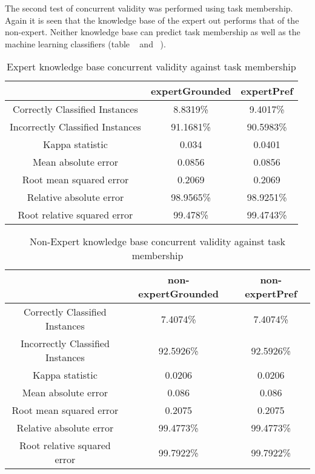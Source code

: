 The second test of concurrent validity was performed using task membership. Again it is seen that the knowledge base of the expert out performs that of the non-expert. Neither knowledge base can predict task membership as well as the machine learning classifiers (table ~\cite{tab:ecurrenttask} and ~\cite{tab:necurrenttask}). %

\begin{table}[!htbp]
\centering
\begin{tabular}{|c|c|c|}
\hline
                                 & expertGrounded  & expertPref \\ \hline
Correctly Classified Instances   & 8.8319\%      & 9.4017\% \\
Incorrectly Classified Instances & 91.1681\%     & 90.5983\% \\
Kappa statistic                  & 0.034         & 0.0401    \\
Mean absolute error              & 0.0856        & 0.0856    \\
Root mean squared error          & 0.2069        & 0.2069    \\
Relative absolute error          & 98.9565\%     & 98.9251\% \\
Root relative squared error      & 99.478\%      & 99.4743\% \\
\hline
\end{tabular}
\caption{Expert knowledge base concurrent validity against task membership}
\label{tab:ecurrenttask}
\end{table}

\begin{table}[!htbp]
\centering
\begin{tabular}{|c|c|c|}
\hline
                                 & non-expertGrounded  & non-expertPref \\ \hline
Correctly Classified Instances   & 7.4074\%         & 7.4074\%  \\
Incorrectly Classified Instances & 92.5926\%        & 92.5926\%  \\
Kappa statistic                  & 0.0206           & 0.0206  \\
Mean absolute error              & 0.086            & 0.086   \\
Root mean squared error          & 0.2075           & 0.2075  \\
Relative absolute error          & 99.4773\%       & 99.4773\%  \\
Root relative squared error      & 99.7922\%       & 99.7922\%  \\
\hline
\end{tabular}
\caption{Non-Expert knowledge base concurrent validity against task membership}
\label{tab:necurrenttask}
\end{table}

